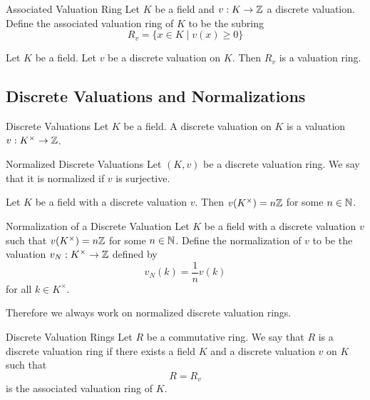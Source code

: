 \documentclass[a4paper]{article}
\begin{document}
\begin{defn}{Associated Valuation Ring}{} Let $K$ be a field and $v:K\to\mathbb{Z}$ a discrete valuation. Define the associated valuation ring of $K$ to be the subring $$R_v=\{x\in K\;|\;v(x)\geq 0\}$$
\end{defn}

\begin{lmm}{}{} Let $K$ be a field. Let $v$ be a discrete valuation on $K$. Then $R_v$ is a valuation ring. 
\end{lmm}

\subsection{Discrete Valuations and Normalizations}
\begin{defn}{Discrete Valuations}{} Let $K$ be a field. A discrete valuation on $K$ is a valuation $v:K^\times\to\mathbb{Z}$. 
\end{defn}

\begin{defn}{Normalized Discrete Valuations}{} Let $(K,v)$ be a discrete valuation ring. We say that it is normalized if $v$ is surjective. 
\end{defn}

\begin{lmm}{}{} Let $K$ be a field with a discrete valuation $v$. Then $v(K^\times)=n\mathbb{Z}$ for some $n\in\mathbb{N}$. 
\end{lmm}

\begin{lmm}{Normalization of a Discrete Valuation}{} Let $K$ be a field with a discrete valuation $v$ such that $v(K^\times)=n\mathbb{Z}$ for some $n\in\mathbb{N}$. Define the normalization of $v$ to be the valuation $v_N:K^\times\to\mathbb{Z}$ defined by $$v_N(k)=\frac{1}{n}v(k)$$ for all $k\in K^\times$. 
\end{lmm}

Therefore we always work on normalized discrete valuation rings. 

\begin{defn}{Discrete Valuation Rings}{} Let $R$ be a commutative ring. We say that $R$ is a discrete valuation ring if there exists a field $K$ and a discrete valuation $v$ on $K$ such that $$R=R_v$$ is the associated valuation ring of $K$. 
\end{defn}
\end{document}

